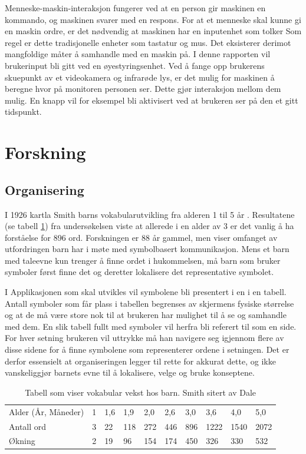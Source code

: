 \documentclass[phd,tocprelim]{cornell}
\begin{document}
Menneske-maskin-interaksjon fungerer ved at en person gir maskinen en kommando, og maskinen svarer med en respons. For at et menneske skal kunne gi en maskin ordre, er det nødvendig at maskinen har en inputenhet som tolker  Som regel er dette tradisjonelle enheter som tastatur og mus. Det eksisterer derimot mangfoldige måter å samhandle med en maskin på. I denne rapporten vil brukerinput bli gitt ved en øyestyringsenhet.  Ved å fange opp brukerens skuepunkt av et videokamera og infrarøde lys, er det mulig for maskinen å beregne hvor på monitoren personen ser. Dette gjør interaksjon mellom dem mulig. En knapp vil for eksempel bli aktivisert ved at brukeren ser på den et gitt tidspunkt. 




\section{Forskning}


\subsection{Organisering}


I 1926 kartla Smith\cite{Smith} barns vokabularutvikling fra alderen 1 til 5 år . Resultatene (se tabell \ref{fig:BarnVak}) fra undersøkelsen viste at allerede i en alder av 3 er det vanlig å ha forståelse for 896 ord. Forskningen er 88 år gammel, men viser omfanget av utfordringen barn har i møte med symbolbasert kommunikasjon. Mens et barn med taleevne kun trenger å finne ordet i hukommelsen, må barn som bruker symboler først finne det og deretter lokalisere det representative symbolet. 

I Applikasjonen som skal utvikles vil symbolene bli presentert i en i en tabell. Antall symboler som får plass i tabellen begrenses av skjermens fysiske størrelse og at de må være store nok til at brukeren har mulighet til å se  og samhandle med dem. En slik tabell fullt med symboler vil herfra bli referert til som en side. For hver setning brukeren vil uttrykke må han navigere seg igjennom flere av disse sidene for å finne symbolene som representerer ordene i setningen. Det er derfor essensielt at organiseringen legger til rette for akkurat dette, og ikke vanskeliggjør barnets evne til å lokalisere, velge og bruke konseptene.

\begin{table}[h]
\begin{tabular}{llllllllll}
\hline
Alder (År, Måneder) & 1 & 1,6 & 1,9 & 2,0 & 2,6 & 3,0 & 3,6  & 4,0  & 5,0  \\ 
Antall ord          & 3 & 22  & 118 & 272 & 446 & 896 & 1222 & 1540 & 2072 \\ 
Økning              & 2 & 19  & 96  & 154 & 174 & 450 & 326  & 330  & 532  \\ \hline
\end{tabular}
\caption{Tabell som viser vokabular vekst hos barn.  Smith \cite{Smith} sitert av Dale \cite{Dale} }
\label{fig:BarnVak}
\end{table}
\end{document}
